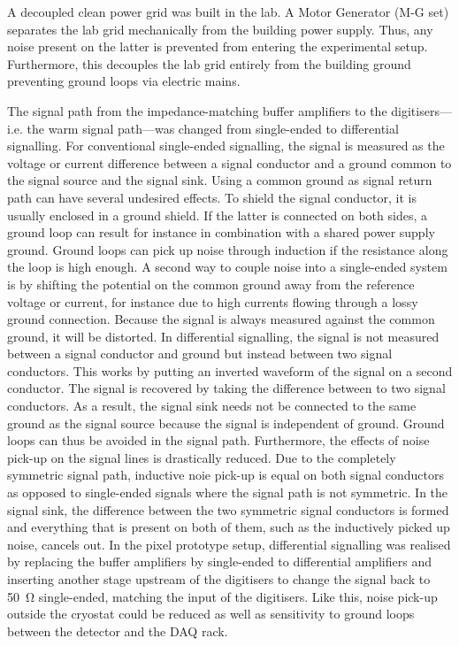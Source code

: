 A decoupled clean power grid was built in the lab.
A Motor Generator (M-G set) separates the lab grid mechanically from the building power supply.
Thus, any noise present on the latter is prevented from entering the experimental setup.
Furthermore, this decouples the lab grid entirely from the building ground preventing ground loops via electric mains.

The signal path from the impedance-matching buffer amplifiers to the digitisers---i.e. the warm signal path---was changed from single-ended to differential signalling.
For conventional single-ended signalling, the signal is measured as the voltage or current difference between a signal conductor and a ground common to the signal source and the signal sink.
Using a common ground as signal return path can have several undesired effects.
To shield the signal conductor, it is usually enclosed in a ground shield.
If the latter is connected on both sides, a ground loop can result for instance in combination with a shared power supply ground.
Ground loops can pick up noise through induction if the resistance along the loop is high enough.
A second way to couple noise into a single-ended system is by shifting the potential on the common ground away from the reference voltage or current, for instance due to high currents flowing through a lossy ground connection.
Because the signal is always measured against the common ground, it will be distorted.
In differential signalling, the signal is not measured between a signal conductor and ground but instead between two signal conductors.
This works by putting an inverted waveform of the signal on a second conductor.
The signal is recovered by taking the difference between to two signal conductors.
As a result, the signal sink needs not be connected to the same ground as the signal source because the signal is independent of ground.
Ground loops can thus be avoided in the signal path.
Furthermore, the effects of noise pick-up on the signal lines is drastically reduced.
Due to the completely symmetric signal path, inductive noie pick-up is equal on both signal conductors as opposed to single-ended signals where the signal path is not symmetric.
In the signal sink, the difference between the two symmetric signal conductors is formed and everything that is present on both of them, such as the inductively picked up noise, cancels out.
In the pixel prototype setup, differential signalling was realised by replacing the buffer amplifiers by single-ended to differential amplifiers and inserting another stage upstream of the digitisers to change the signal back to \SI{50}{\ohm} single-ended, matching the input of the digitisers.
Like this, noise pick-up outside the cryostat could be reduced as well as sensitivity to ground loops between the detector and the DAQ rack.

